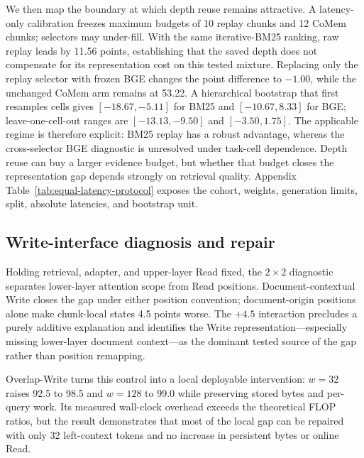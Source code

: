 

We then map the boundary at which depth reuse remains attractive. A latency-only
calibration freezes maximum budgets of 10 replay chunks and 12 CoMem chunks;
selectors may under-fill. With the same iterative-BM25 ranking, raw replay leads
by 11.56 points, establishing that the saved depth does not compensate for its
representation cost on this tested mixture. Replacing only the replay selector
with frozen BGE changes the point difference to $-1.00$, while the unchanged
CoMem arm remains at 53.22. A hierarchical bootstrap that first resamples cells gives
$[-18.67,-5.11]$ for BM25 and $[-10.67,8.33]$ for BGE; leave-one-cell-out
ranges are $[-13.13,-9.50]$ and $[-3.50,1.75]$. The applicable regime is
therefore explicit: BM25 replay has a robust advantage, whereas the
cross-selector BGE diagnostic is unresolved under task-cell dependence. Depth
reuse can buy a larger evidence budget, but whether that budget closes the
representation gap depends strongly on retrieval quality.
Appendix Table~\ref{tab:equal-latency-protocol} exposes the cohort, weights,
generation limits, split, absolute latencies, and bootstrap unit.

\subsection{Write-interface diagnosis and repair}



Holding retrieval, adapter, and upper-layer Read fixed, the $2{\times}2$
diagnostic separates lower-layer attention scope from Read positions.
Document-contextual Write closes the gap under either position convention;
document-origin positions alone make chunk-local states 4.5 points worse. The $+4.5$ interaction precludes a purely additive explanation and identifies
the Write representation---especially missing lower-layer document context---as
the dominant tested source of the gap rather than position remapping.

Overlap-Write turns this control into a local deployable intervention:
$w{=}32$ raises 92.5 to 98.5 and $w{=}128$ to 99.0 while preserving stored
bytes and per-query work. Its measured wall-clock overhead exceeds the theoretical FLOP ratios, but the
result demonstrates that most of the local gap can be repaired with only 32
left-context tokens and no increase in persistent bytes or online Read.

